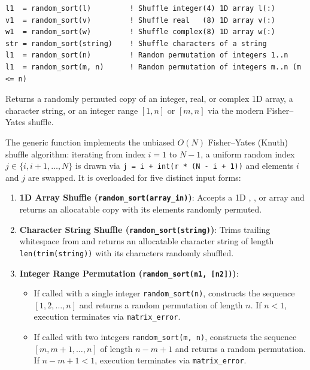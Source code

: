 
\lstset{language=[95]Fortran}
\begin{lstlisting}
l1  = random_sort(l)         ! Shuffle integer(4) 1D array l(:)
v1  = random_sort(v)         ! Shuffle real   (8) 1D array v(:)
w1  = random_sort(w)         ! Shuffle complex(8) 1D array w(:)
str = random_sort(string)    ! Shuffle characters of a string
l1  = random_sort(n)         ! Random permutation of integers 1..n
l1  = random_sort(m, n)      ! Random permutation of integers m..n (m <= n)
\end{lstlisting}

Returns a randomly permuted copy of an integer, real, or complex 1D array, a character string, or an integer range $[1,n]$ or $[m,n]$ via the modern Fisher--Yates shuffle.

The generic function  implements the unbiased $O(N)$ Fisher--Yates (Knuth) shuffle algorithm: iterating from index $i = 1$ to $N-1$, a uniform random index $j \in \{i, i+1, \ldots, N\}$ is drawn via \texttt{j = i + int(r * (N - i + 1))} and elements $i$ and $j$ are swapped. It is overloaded for five distinct input forms:
\begin{enumerate}
  \item \textbf{1D Array Shuffle (\texttt{random\_sort(array\_in)})}: Accepts a 1D , , or  array and returns an allocatable copy with its elements randomly permuted.
  \item \textbf{Character String Shuffle (\texttt{random\_sort(string)})}: Trims trailing whitespace from  and returns an allocatable character string of length \texttt{len(trim(string))} with its characters randomly shuffled.
  \item \textbf{Integer Range Permutation (\texttt{random\_sort(n1, [n2])})}:
  \begin{itemize}
    \item If called with a single integer \texttt{random\_sort(n)}, constructs the sequence $[1, 2, \ldots, n]$ and returns a random permutation of length $n$. If $n < 1$, execution terminates via \texttt{matrix\_error}.
    \item If called with two integers \texttt{random\_sort(m, n)}, constructs the sequence $[m, m+1, \ldots, n]$ of length $n - m + 1$ and returns a random permutation. If $n - m + 1 < 1$, execution terminates via \texttt{matrix\_error}.
  \end{itemize}
\end{enumerate}

